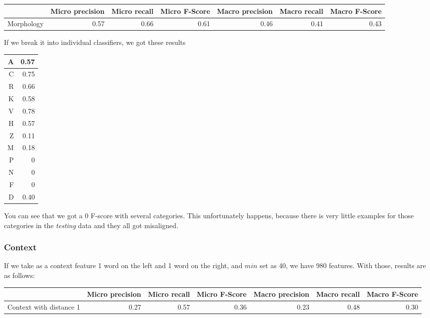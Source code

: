 \documentclass[letterpaper]{article}
\begin{document}
\begin{tabular}{|r|r|r|r|r|r|r|}
 \hline
 & \textbf{Micro precision} &  \textbf{Micro recall}  &  \textbf{Micro F-Score} & \textbf{Macro precision} &  \textbf{Macro recall}  &  \textbf{Macro F-Score} \\ \hline
Morphology & 0.57 & 0.66 & 0.61 & 0.46 & 0.41 & 0.43 \\ \hline
\end{tabular}

If we break it into individual classifiers, we got these results


\begin{tabular}{|r|r|}
    A & 0.57 \\ \hline
    C & 0.75 \\ \hline
    R & 0.66 \\ \hline
    K & 0.58 \\ \hline
    V & 0.78 \\ \hline
    H & 0.57 \\ \hline
    Z & 0.11 \\ \hline
    M & 0.18 \\ \hline
    P & 0 \\ \hline
    N & 0 \\ \hline
    F & 0 \\ \hline
    D & 0.40 \\ \hline

\end{tabular}

You can see that we got a 0 F-score with several categories. This unfortunately happens, because there is very little examples for those categories in the \emph{testing} data and they all got misaligned.

\subsubsection{Context}
If we take as a context feature 1 word on the left and 1 word on the right, and $min$ set as 40, we have 980 features. With those, results are as follows:


\begin{tabular}{|r|r|r|r|r|r|r|}
 \hline
 & \textbf{Micro precision} &  \textbf{Micro recall}  &  \textbf{Micro F-Score} & \textbf{Macro precision} &  \textbf{Macro recall}  &  \textbf{Macro F-Score} \\ \hline
Context with distance 1 & 0.27 & 0.57 & 0.36 & 0.23 & 0.48 & 0.30 \\ \hline
\end{tabular}
\end{document}
